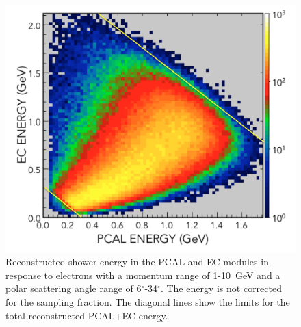 \begin{figure}[t]
\centering
\includegraphics[width=0.8\columnwidth,keepaspectratio]{img/S10_1_000.png}
\caption[]{Reconstructed shower energy in the PCAL and EC modules in response to electrons with a momentum
  range of 1-10~GeV and a polar scattering angle range of 6$^\circ$-34$^\circ$. The energy is not corrected for
  the sampling fraction. The diagonal lines show the limits for the total reconstructed PCAL+EC energy.}
\label{fig:S10_1_000}
\end{figure}

